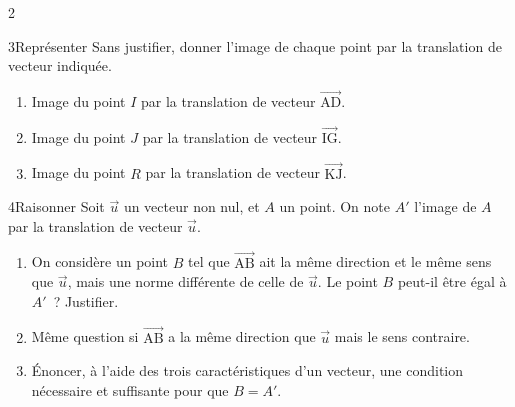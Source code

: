 \documentclass[10pt,a4paper]{article}
\newcommand{\starfull}[1]{{\color{#1}\ding{72}}}
\newcommand{\starempty}{{\color{gray!45}\ding{73}}}
\newcommand{\Vj}[1]{\overrightarrow{\text{#1}}}
\begin{document}
\begin{multicols}{2}
\begin{Exo}{3}{\starfull{diffgreen}\starempty\starempty}{Repr\'esenter}
Sans justifier, donner l'image de chaque point par la translation de vecteur indiqu\'ee.
\begin{center}
\end{center}
\begin{enumerate}
\item Image du point $I$ par la translation de vecteur $\Vj{AD}$.
\item Image du point $J$ par la translation de vecteur $\Vj{IG}$.
\item Image du point $R$ par la translation de vecteur $\Vj{KJ}$.
\end{enumerate}
\end{Exo}

\begin{Exo}{4}{\starfull{diffred}\starfull{diffred}\starfull{diffred}}{Raisonner}
Soit $\vec u$ un vecteur non nul, et $A$ un point. On note $A'$ l'image de $A$ par la translation de vecteur $\vec u$.
\begin{enumerate}
\item On consid\`ere un point $B$ tel que $\Vj{AB}$ ait la m\^eme direction et le m\^eme sens que $\vec u$, mais une norme diff\'erente de celle de $\vec u$. Le point $B$ peut-il \^etre \'egal \`a $A'$~? Justifier.
\item M\^eme question si $\Vj{AB}$ a la m\^eme direction que $\vec u$ mais le sens contraire.
\item \'Enoncer, \`a l'aide des trois caract\'eristiques d'un vecteur, une condition n\'ecessaire et suffisante pour que $B=A'$.
\end{enumerate}
\end{Exo}


\end{multicols}
\end{document}
